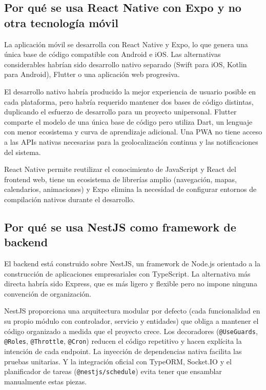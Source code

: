 \subsection{Por qué se usa React Native con Expo y no otra tecnología móvil}

La aplicación móvil se desarrolla con React Native y Expo, lo que genera una única base de código compatible con Android e iOS. Las alternativas considerables habrían sido desarrollo nativo separado (Swift para iOS, Kotlin para Android), Flutter o una aplicación web progresiva.

El desarrollo nativo habría producido la mejor experiencia de usuario posible en cada plataforma, pero habría requerido mantener dos bases de código distintas, duplicando el esfuerzo de desarrollo para un proyecto unipersonal. Flutter comparte el modelo de una única base de código pero utiliza Dart, un lenguaje con menor ecosistema y curva de aprendizaje adicional. Una PWA no tiene acceso a las APIs nativas necesarias para la geolocalización continua y las notificaciones del sistema.

React Native permite reutilizar el conocimiento de JavaScript y React del frontend web, tiene un ecosistema de librerías amplio (navegación, mapas, calendarios, animaciones) y Expo elimina la necesidad de configurar entornos de compilación nativos durante el desarrollo.

\subsection{Por qué se usa NestJS como framework de backend}

El backend está construido sobre NestJS, un framework de Node.js orientado a la construcción de aplicaciones empresariales con TypeScript. La alternativa más directa habría sido Express, que es más ligero y flexible pero no impone ninguna convención de organización.

NestJS proporciona una arquitectura modular por defecto (cada funcionalidad en su propio módulo con controlador, servicio y entidades) que obliga a mantener el código organizado a medida que el proyecto crece. Los decoradores (\texttt{@UseGuards}, \texttt{@Roles}, \texttt{@Throttle}, \texttt{@Cron}) reducen el código repetitivo y hacen explícita la intención de cada endpoint. La inyección de dependencias nativa facilita las pruebas unitarias. Y la integración oficial con TypeORM, Socket.IO y el planificador de tareas (\texttt{@nestjs/schedule}) evita tener que ensamblar manualmente estas piezas.

